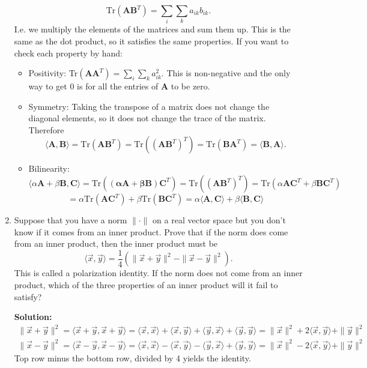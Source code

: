 \documentclass[11pt,fleqn]{article}
\begin{document}
\begin{enumerate}
\[\text{Tr}(\mathbf{AB}^T) = \sum_i\sum_ka_{ik}b_{ik}.\]
I.e. we multiply the elements of the matrices and sum them up.
This is the same as the dot product, so it satisfies the same properties.
If you want to check each property by hand:
\begin{itemize}
\item Positivity: Tr$(\mathbf{AA}^T) = \sum_i\sum_ka_{ik}^2$. This is non-negative and the only way to get 0 is for all the entries of {\bf A} to be zero.
\item Symmetry: Taking the transpose of a matrix does not change the diagonal elements, so it does not change the trace of the matrix. Therefore
\[\langle\mathbf{A},\mathbf{B}\rangle = \text{Tr}(\mathbf{AB}^T) = \text{Tr}((\mathbf{AB}^T)^T)=\text{Tr}(\mathbf{BA}^T) = \langle\mathbf{B},\mathbf{A}\rangle.\]
\item Bilinearity:
\[\langle\alpha\mathbf{A}+\beta\mathbf{B},\mathbf{C}\rangle = \text{Tr}(\mathbf{(\alpha\mathbf{A}+\beta\mathbf{B})\mathbf{C}}^T) = \text{Tr}((\mathbf{AB}^T)^T)=\text{Tr}(\alpha\mathbf{AC}^T + \beta\mathbf{BC}^T)\]\[ = \alpha\text{Tr}(\mathbf{AC}^T)+  \beta\text{Tr}(\mathbf{BC}^T)=\alpha\langle\mathbf{A},\mathbf{C}\rangle+\beta\langle\mathbf{B},\mathbf{C}\rangle\]
\end{itemize}

\item Suppose that you have a norm $\|\cdot\|$ on a real vector space but you don't know if it comes from an inner product.
Prove that if the norm does come from an inner product, then the inner product must be
	\[\langle\vec{x},\vec{y}\rangle = \frac{1}{4}\left(\|\vec{x}+\vec{y}\|^2-\|\vec{x}-\vec{y}\|^2\right).\] This is called a polarization identity. If the norm does not come from an inner product, which of the three properties of an inner product will it fail to satisfy?
	
{\bf Solution:}
\begin{eqnarray*}
\|\vec{x}+\vec{y}\|^2 = \langle\vec{x}+\vec{y},\vec{x}+\vec{y}\rangle = \langle\vec{x},\vec{x}\rangle + \langle\vec{x},\vec{y}\rangle + \langle\vec{y},\vec{x}\rangle + \langle\vec{y},\vec{y}\rangle=\|\vec{x}\|^2 +2 \langle\vec{x},\vec{y}\rangle+\|\vec{y}\|^2\\
\|\vec{x}-\vec{y}\|^2 = \langle\vec{x}-\vec{y},\vec{x}-\vec{y}\rangle = \langle\vec{x},\vec{x}\rangle - \langle\vec{x},\vec{y}\rangle - \langle\vec{y},\vec{x}\rangle + \langle\vec{y},\vec{y}\rangle=\|\vec{x}\|^2 -2 \langle\vec{x},\vec{y}\rangle+\|\vec{y}\|^2
\end{eqnarray*}
Top row minus the bottom row, divided by 4 yields the identity.\\


\end{enumerate}
\end{document}
